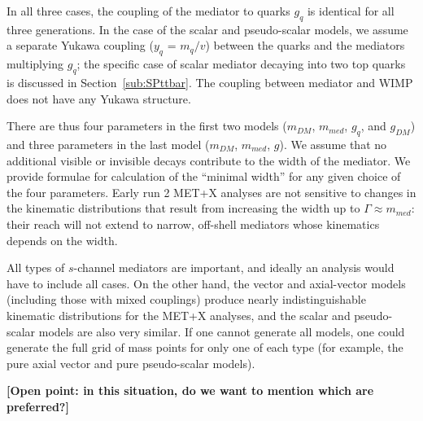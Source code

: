 \documentclass[a4,debug,notitlepage,nobib]{tufte-handout}
\newcommand{\mdm}{\ensuremath{m_{DM}}\xspace}
\begin{document}
In all three cases, the coupling of the mediator to quarks $g_q$ is
identical for all three generations. 
In the case of the scalar and pseudo-scalar models, we assume a separate 
Yukawa coupling ($y_q$ = $m_q/v$) between the quarks and the mediators
multiplying $g_q$; the specific case of scalar mediator decaying
into two top quarks is discussed in Section~\ref{sub:SPttbar}. The
coupling between mediator and WIMP does not have any Yukawa structure.

There are thus four parameters in the first two
models (\mdm, $m_{med}$, $g_q$, and $g_{DM}$) and three parameters
in the last model (\mdm, $m_{med}$, $g$). We assume that no
additional visible or invisible decays contribute to the width of the
mediator. We provide formulae for calculation of the ``minimal
width'' for any given choice of the four parameters. Early run 2 MET+X
analyses are not sensitive to changes in the kinematic distributions that 
result from increasing the width up to $\Gamma \approx m_{med}$: their
reach will not extend to narrow, off-shell mediators whose kinematics
depends on the width. 

All types of $s$-channel mediators are important, and ideally an analysis 
would have to include all cases. On the other hand, the vector and axial-vector models 
(including those with mixed couplings) produce nearly indistinguishable kinematic distributions 
for the MET+X analyses, and the scalar and pseudo-scalar models are also very similar. 
If one cannot generate all models, one could generate the full grid of mass points for only one of each 
type (for example, the pure axial vector and pure pseudo-scalar models). 

\textbf{[Open point: in this situation, do we want to mention which are
    preferred?]}
\end{document}
